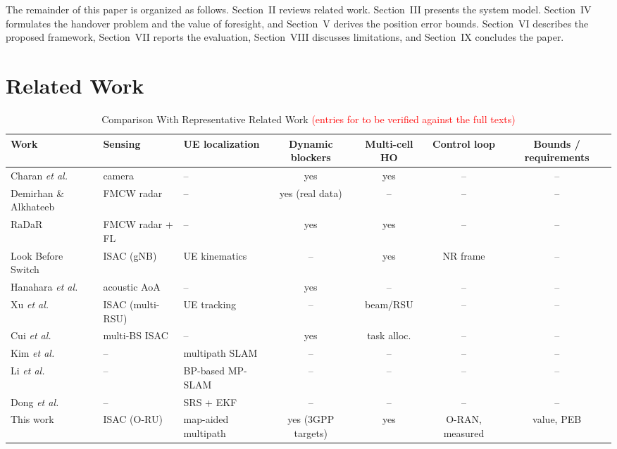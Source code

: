 \documentclass[journal]{IEEEtran}
\begin{document}
The remainder of this paper is organized as follows. Section~II reviews
related work. Section~III presents the system model. Section~IV
formulates the handover problem and the value of foresight, and
Section~V derives the position error bounds. Section~VI describes the
proposed framework, Section~VII reports the evaluation, Section~VIII
discusses limitations, and Section~IX concludes the paper.

\section{Related Work}
\begin{table}[t]
\centering
\caption{Comparison With Representative Related Work
\textcolor{red}{(entries for \cite{xu2025isacbeam,cui2025multiview,hanahara2024acoustic,li2025lookbefore}
to be verified against the full texts)}}
\label{tab:related}
\setlength{\tabcolsep}{3pt}
\begin{tabular}{@{}lllcccc@{}}
\toprule
Work & Sensing & UE localization & Dynamic blockers & Multi-cell HO & Control loop & Bounds / requirements\\
\midrule
Charan \emph{et al.} \cite{charan2021vision} & camera & -- & yes & yes & -- & --\\
Demirhan \& Alkhateeb \cite{demirhan2022radarblockage} & FMCW radar & -- & yes (real data) & -- & -- & --\\
RaDaR \cite{alquraan2023radar} & FMCW radar + FL & -- & yes & yes & -- & --\\
Look Before Switch \cite{li2025lookbefore} & ISAC (gNB) & UE kinematics & -- & yes & NR frame & --\\
Hanahara \emph{et al.} \cite{hanahara2024acoustic} & acoustic AoA & -- & yes & -- & -- & --\\
Xu \emph{et al.} \cite{xu2025isacbeam} & ISAC (multi-RSU) & UE tracking & -- & beam/RSU & -- & --\\
Cui \emph{et al.} \cite{cui2025multiview} & multi-BS ISAC & -- & yes & task alloc. & -- & --\\
Kim \emph{et al.} \cite{kim2022pmbm} & -- & multipath SLAM & -- & -- & -- & --\\
Li \emph{et al.} \cite{li2024bpslam} & -- & BP-based MP-SLAM & -- & -- & -- & --\\
Dong \emph{et al.} \cite{dong2026deployable} & -- & SRS + EKF & -- & -- & -- & --\\
\midrule
This work & ISAC (O-RU) & map-aided multipath & yes (3GPP targets) & yes & O-RAN, measured & value, PEB\\
\bottomrule
\end{tabular}
\end{table}
\end{document}

